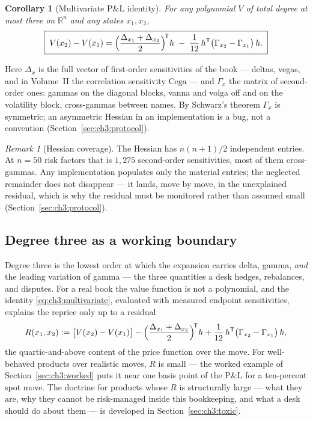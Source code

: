 \documentclass[11pt]{book}
\theoremstyle{plain}
\newtheorem{corollary}[theorem]{Corollary}
\theoremstyle{definition}
\theoremstyle{remark}
\newtheorem{remark}[theorem]{Remark}
\newcommand{\Cega}{\mathrm{Cega}}                %
\begin{document}
\begin{corollary}[Multivariate P\&L identity]\label{cor:ch3:multivariate}
For any polynomial $V$ of total degree at most three on $\mathbb{R}^n$ and any
states $x_1, x_2$,
\begin{equation}\label{eq:ch3:multivariate}
  \boxed{\;
  V(x_2) - V(x_1)
  = \Bigl(\frac{\Delta_{x_1} + \Delta_{x_2}}{2}\Bigr)^{\!\mathsf T} h
  \;-\; \frac{1}{12}\, h^{\mathsf T}
        \bigl(\Gamma_{x_2} - \Gamma_{x_1}\bigr)\, h .
  \;}
\end{equation}
\end{corollary}

Here $\Delta_x$ is the full vector of first-order sensitivities of the book
--- deltas, vegas, and in Volume~II the correlation sensitivity $\Cega$ ---
and $\Gamma_x$ the matrix of second-order ones: gammas on the diagonal
blocks, vanna and volga off and on the volatility block, cross-gammas between
names. By Schwarz's theorem $\Gamma_x$ is symmetric; an asymmetric Hessian in
an implementation is a bug, not a convention (Section~\ref{sec:ch3:protocol}).

\begin{remark}[Hessian coverage]\label{rem:ch3:hessian-coverage}
The Hessian has $n(n+1)/2$ independent entries. At $n = 50$ risk factors that
is $1{,}275$ second-order sensitivities, most of them cross-gammas. Any
implementation populates only the material entries; the
neglected remainder does not disappear --- it lands, move by move, in the
unexplained residual, which is why the residual must be monitored
rather than assumed small (Section~\ref{sec:ch3:protocol}).
\end{remark}

\subsection{Degree three as a working boundary}\label{sec:ch3:why-cubic}

Degree three is the lowest order at which the expansion
carries delta, gamma, \emph{and} the leading variation of gamma --- the three
quantities a desk hedges, rebalances, and disputes. For a real
book the value function is not a polynomial, and the identity
\eqref{eq:ch3:multivariate}, evaluated with measured endpoint sensitivities,
explains the reprice only up to a residual
\begin{equation}\label{eq:ch3:residual}
  R(x_1, x_2)
  := \bigl[V(x_2) - V(x_1)\bigr]
   - \Bigl(\frac{\Delta_{x_1} + \Delta_{x_2}}{2}\Bigr)^{\!\mathsf T} h
   + \frac{1}{12}\, h^{\mathsf T}\bigl(\Gamma_{x_2} - \Gamma_{x_1}\bigr)\, h ,
\end{equation}
the quartic-and-above content of the price function over the move. For
well-behaved products over realistic moves, $R$ is small --- the worked
example of Section~\ref{sec:ch3:worked} puts it near one basis point of the
P\&L for a ten-percent spot move. The doctrine for products whose $R$ is
structurally large --- what they are, why they cannot be risk-managed inside
this bookkeeping, and what a desk should do about them --- is developed in
Section~\ref{sec:ch3:toxic}.
\end{document}
